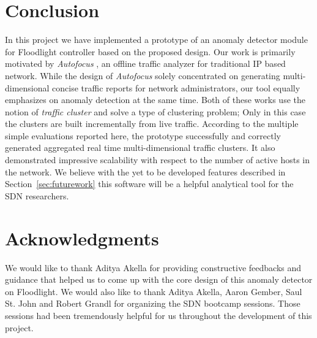 \documentclass[twocolumn]{article}
\begin{document}
\section{Conclusion}
\label{sec:summary}
In this project we have implemented a prototype of an anomaly detector module for Floodlight controller based on the proposed design. Our work is primarily motivated by \emph{Autofocus} \cite{autofocus}, an offline traffic analyzer for traditional IP based network. While the design of \emph{Autofocus} solely concentrated on generating multi-dimensional concise traffic reports for network administrators, our tool equally emphasizes on anomaly detection at the same time. Both of these works use the notion of \emph{traffic cluster} and solve a type of clustering problem; Only in this case the clusters are built incrementally from live traffic. According to the multiple simple evaluations reported here, the prototype successfully and correctly generated aggregated real time multi-dimensional traffic clusters. It also demonstrated impressive scalability with respect to the number of active hosts in the network. We believe with the yet to be developed features described in Section~\ref{sec:futurework} this software will be a helpful analytical tool for the SDN researchers. 

\section{Acknowledgments}
We would like to thank Aditya Akella for providing constructive feedbacks and guidance that helped us to come up with the core design of this anomaly detector on Floodlight. We would also like to thank Aditya Akella, Aaron Gember, Saul St. John and Robert Grandl for organizing the SDN bootcamp sessions. Those sessions had been tremendously helpful for us throughout the development of this project. 


\label{references}

\end{document}
